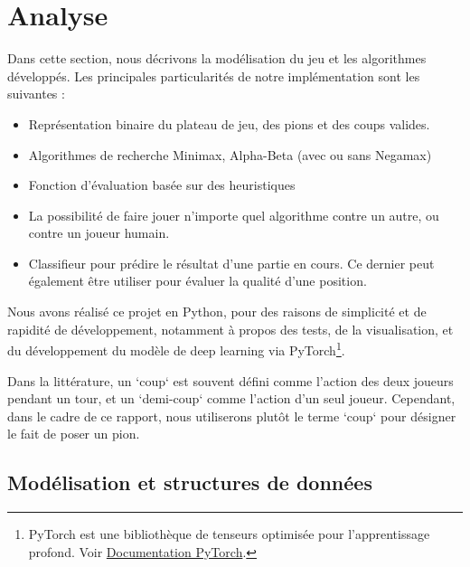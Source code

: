 \chapter{Analyse}
\label{chap:anal}
Dans cette section, nous décrivons la modélisation du jeu et les algorithmes développés. Les principales particularités de notre implémentation sont les suivantes :
\begin{itemize}
    \item Représentation binaire du plateau de jeu, des pions et des coups valides.
    \item Algorithmes de recherche Minimax, Alpha-Beta (avec ou sans Negamax)
    \item Fonction d'évaluation basée sur des heuristiques
    \item La possibilité de faire jouer n'importe quel algorithme contre un autre, ou contre un joueur humain.
    \item Classifieur pour prédire le résultat d'une partie en cours. Ce dernier peut également être utiliser pour évaluer la qualité d'une position.
\end{itemize}

Nous avons réalisé ce projet en Python, pour des raisons de simplicité et de rapidité de développement, notamment à propos des tests, de la visualisation, et du développement du modèle de deep learning via PyTorch\footnote{PyTorch est une bibliothèque de tenseurs optimisée pour l'apprentissage profond. Voir \href{https://pytorch.org/docs/stable/index.html}{Documentation PyTorch}.}.

Dans la littérature, un `coup` est souvent défini comme l'action des deux joueurs pendant un tour, et un `demi-coup` comme l'action d'un seul joueur. Cependant, dans le cadre de ce rapport, nous utiliserons plutôt le terme `coup` pour désigner le fait de poser un pion.


\section{Modélisation et structures de données}
\label{sec:mod}

